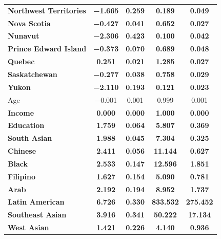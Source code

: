 \documentclass[
  letterpaper,
  DIV=11,
  numbers=noendperiod]{scrartcl}
\begin{document}
\begin{table}
{\begin{tabular}[t]{lcccc}
\textbf{Northwest Territories} & \textbf{\num{-1.665}} & \textbf{\num{0.259}} & \textbf{\num{0.189}} & \textbf{\num{0.049}}\\
\textbf{Nova Scotia} & \textbf{\num{-0.427}} & \textbf{\num{0.041}} & \textbf{\num{0.652}} & \textbf{\num{0.027}}\\
\textbf{Nunavut} & \textbf{\num{-2.306}} & \textbf{\num{0.423}} & \textbf{\num{0.100}} & \textbf{\num{0.042}}\\
\textbf{Prince Edward Island} & \textbf{\num{-0.373}} & \textbf{\num{0.070}} & \textbf{\num{0.689}} & \textbf{\num{0.048}}\\
\textbf{Quebec} & \textbf{\num{0.251}} & \textbf{\num{0.021}} & \textbf{\num{1.285}} & \textbf{\num{0.027}}\\
\textbf{Saskatchewan} & \textbf{\num{-0.277}} & \textbf{\num{0.038}} & \textbf{\num{0.758}} & \textbf{\num{0.029}}\\
\textbf{Yukon} & \textbf{\num{-2.110}} & \textbf{\num{0.193}} & \textbf{\num{0.121}} & \textbf{\num{0.023}}\\
Age & \num{-0.001} & \num{0.001} & \num{0.999} & \num{0.001}\\
\textbf{Income} & \textbf{\num{0.000}} & \textbf{\num{0.000}} & \textbf{\num{1.000}} & \textbf{\num{0.000}}\\
\textbf{Education} & \textbf{\num{1.759}} & \textbf{\num{0.064}} & \textbf{\num{5.807}} & \textbf{\num{0.369}}\\
\textbf{South Asian} & \textbf{\num{1.988}} & \textbf{\num{0.045}} & \textbf{\num{7.304}} & \textbf{\num{0.325}}\\
\textbf{Chinese} & \textbf{\num{2.411}} & \textbf{\num{0.056}} & \textbf{\num{11.144}} & \textbf{\num{0.627}}\\
\textbf{Black} & \textbf{\num{2.533}} & \textbf{\num{0.147}} & \textbf{\num{12.596}} & \textbf{\num{1.851}}\\
\textbf{Filipino} & \textbf{\num{1.627}} & \textbf{\num{0.154}} & \textbf{\num{5.090}} & \textbf{\num{0.781}}\\
\textbf{Arab} & \textbf{\num{2.192}} & \textbf{\num{0.194}} & \textbf{\num{8.952}} & \textbf{\num{1.737}}\\
\textbf{Latin American} & \textbf{\num{6.726}} & \textbf{\num{0.330}} & \textbf{\num{833.532}} & \textbf{\num{275.452}}\\
\textbf{Southeast Asian} & \textbf{\num{3.916}} & \textbf{\num{0.341}} & \textbf{\num{50.222}} & \textbf{\num{17.134}}\\
\textbf{West Asian} & \textbf{\num{1.421}} & \textbf{\num{0.226}} & \textbf{\num{4.140}} & \textbf{\num{0.936}}\\

\end{tabular}}
\end{table}
\end{document}
